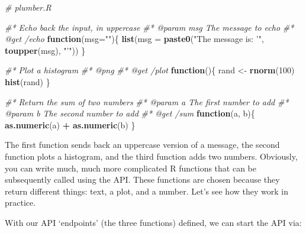 \documentclass[]{book}
\newenvironment{Shaded}{\begin{snugshade}}{\end{snugshade}}
\newcommand{\CommentTok}[1]{\textcolor[rgb]{0.56,0.35,0.01}{\textit{#1}}}
\newcommand{\ControlFlowTok}[1]{\textcolor[rgb]{0.13,0.29,0.53}{\textbf{#1}}}
\newcommand{\DataTypeTok}[1]{\textcolor[rgb]{0.13,0.29,0.53}{#1}}
\newcommand{\DecValTok}[1]{\textcolor[rgb]{0.00,0.00,0.81}{#1}}
\newcommand{\KeywordTok}[1]{\textcolor[rgb]{0.13,0.29,0.53}{\textbf{#1}}}
\newcommand{\NormalTok}[1]{#1}
\newcommand{\OperatorTok}[1]{\textcolor[rgb]{0.81,0.36,0.00}{\textbf{#1}}}
\newcommand{\StringTok}[1]{\textcolor[rgb]{0.31,0.60,0.02}{#1}}
\begin{document}
\begin{Shaded}
\begin{Highlighting}[]
\CommentTok{# plumber.R}

\CommentTok{#* Echo back the input, in uppercase}
\CommentTok{#* @param msg The message to echo}
\CommentTok{#* @get /echo}
\ControlFlowTok{function}\NormalTok{(}\DataTypeTok{msg=}\StringTok{""}\NormalTok{)\{}
  \KeywordTok{list}\NormalTok{(}\DataTypeTok{msg =} \KeywordTok{paste0}\NormalTok{(}\StringTok{"The message is: '"}\NormalTok{, }\KeywordTok{toupper}\NormalTok{(msg), }\StringTok{"'"}\NormalTok{))}
\NormalTok{\}}

\CommentTok{#* Plot a histogram}
\CommentTok{#* @png}
\CommentTok{#* @get /plot}
\ControlFlowTok{function}\NormalTok{()\{}
\NormalTok{  rand <-}\StringTok{ }\KeywordTok{rnorm}\NormalTok{(}\DecValTok{100}\NormalTok{)}
  \KeywordTok{hist}\NormalTok{(rand)}
\NormalTok{\}}

\CommentTok{#* Return the sum of two numbers}
\CommentTok{#* @param a The first number to add}
\CommentTok{#* @param b The second number to add}
\CommentTok{#* @get /sum}
\ControlFlowTok{function}\NormalTok{(a, b)\{}
  \KeywordTok{as.numeric}\NormalTok{(a) }\OperatorTok{+}\StringTok{ }\KeywordTok{as.numeric}\NormalTok{(b)}
\NormalTok{\}}
\end{Highlighting}
\end{Shaded}

The first function sends back an uppercase version of a message, the second function plots a histogram, and the third function adds two numbers. Obviously, you can write much, much more complicated R functions that can be subsequently called using the API. These functions are chosen because they return different things: text, a plot, and a number. Let's see how they work in practice.

With our API `endpoints' (the three functions) defined, we can start the API via:

\begin{Shaded}
\end{Shaded}
\end{document}
